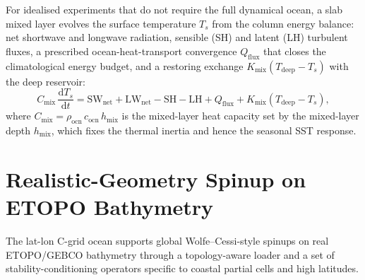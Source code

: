 \documentclass[11pt,twoside]{report}
\newcommand{\dd}{\mathrm{d}}
\begin{document}
For idealised experiments that do not require the full dynamical ocean, a
slab mixed layer evolves the surface temperature $T_s$ from the column
energy balance: net shortwave and longwave radiation, sensible (SH) and
latent (LH) turbulent fluxes, a prescribed ocean-heat-transport
convergence $Q_{\mathrm{flux}}$ that closes the climatological energy
budget, and a restoring exchange $K_{\mathrm{mix}}(T_{\mathrm{deep}}-T_s)$
with the deep reservoir:
\begin{equation}
  C_{\mathrm{mix}}\,\frac{\dd T_s}{\dd t}
  = \mathrm{SW}_{\mathrm{net}} + \mathrm{LW}_{\mathrm{net}}
  - \mathrm{SH} - \mathrm{LH}
  + Q_{\mathrm{flux}} + K_{\mathrm{mix}}(T_{\mathrm{deep}}-T_s),
\end{equation}
where $C_{\mathrm{mix}}=\rho_{\mathrm{ocn}}\,c_{\mathrm{ocn}}\,h_{\mathrm{mix}}$
is the mixed-layer heat capacity set by the mixed-layer depth
$h_{\mathrm{mix}}$, which fixes the thermal inertia and hence the seasonal
SST response.


\section{Realistic-Geometry Spinup on ETOPO Bathymetry}
\label{sec:realistic-geometry-ocean}

The lat-lon C-grid ocean supports global Wolfe--Cessi-style spinups on
real ETOPO/GEBCO bathymetry through a topology-aware loader and a set
of stability-conditioning operators specific to coastal partial cells
and high latitudes.
\end{document}
